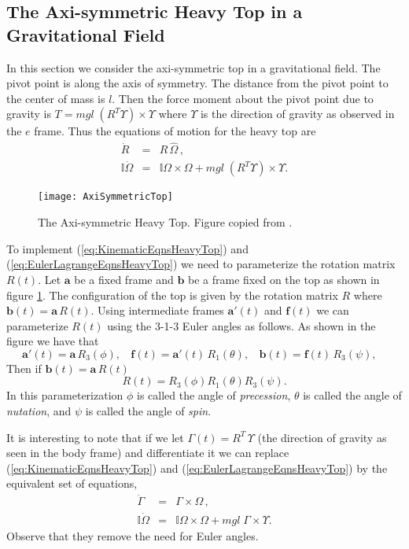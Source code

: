 \documentclass[graybox,envcountchap,sectrefs]{svmonoMuga}
\begin{document}
\subsection{The Axi-symmetric Heavy Top in a Gravitational Field}
In this section we consider the axi-symmetric top in a gravitational field. The pivot point is along the axis of symmetry. The distance from the pivot point to the center of mass is $l$. 
Then the force moment about the pivot point due to gravity is $T= mgl\;(R^T \Upsilon)\times \Upsilon$ where $\Upsilon$ is the direction of gravity as observed in the $e$ frame. Thus the equations of 
motion for the heavy top are
\begin{eqnarray}
\dot{R} &=& R \, \widehat{\Omega}\,, \label{eq:KinematicEqnsHeavyTop} \\
\mathbb{I}\dot{\Omega} &=&  \mathbb{I}\Omega \times \Omega + mgl\;(R^T \Upsilon)\times \Upsilon.
\label{eq:EulerLagrangeEqnsHeavyTop}
\end{eqnarray}
\begin{figure}[ht]
\begin{center}
\texttt{[image: AxiSymmetricTop]}
\renewcommand{\baselinestretch}{1}\selectfont
\caption{The Axi-symmetric Heavy Top. Figure copied from \cite{Greenwood}.}
\label{Fig:HeavyTop}
\renewcommand{\baselinestretch}{1.5}\selectfont
\end{center}
\end{figure}
To implement (\ref{eq:KinematicEqnsHeavyTop}) and (\ref{eq:EulerLagrangeEqnsHeavyTop})
we need to parameterize the rotation matrix $R(t)$.
Let $\mathbf{a}$ be a fixed frame and $\mathbf{b}$ be a frame fixed on the top as shown in figure \ref{Fig:HeavyTop}. The configuration of the top is given by the rotation matrix $R$ where $\mathbf{b}(t)=\mathbf{a}\,R(t)
$. Using intermediate frames $\mathbf{a}'(t)$ and $\mathbf{f}(t)$ we can parameterize $R(t)$ using the 3-1-3 Euler angles as follows. As shown in the figure we have that
\[
\mathbf{a}'(t)=\mathbf{a}\,R_3(\phi),\:\:\:\:\mathbf{f}(t)=\mathbf{a}'(t)\,R_1(\theta),\:\:\:\:\mathbf{b}(t)=\mathbf{f}(t)\,R_3(\psi),\:\:\:\:
\]
Then if $\mathbf{b}(t)=\mathbf{a}\,R(t)$
\[
R(t)=R_3(\phi)R_1(\theta)R_3(\psi).
\]
In this parameterization $\phi$ is called the angle of \textit{precession}, $\theta$ is called the angle of \textit{nutation}, and $\psi$ is called the angle of \textit{spin}.

It is interesting to note that if we let $\Gamma(t)=R^T\,\Upsilon$ (the direction of gravity as seen in the body frame) and differentiate it we can replace 
(\ref{eq:KinematicEqnsHeavyTop}) and (\ref{eq:EulerLagrangeEqnsHeavyTop}) by the equivalent set of equations,
\begin{eqnarray}
\dot{\Gamma} &=& \Gamma \times {\Omega}\,, \label{eq:KinematicEqnsHeavyTop} \\
\mathbb{I}\dot{\Omega} &=&  \mathbb{I}\Omega \times \Omega + mgl\;\Gamma \times \Upsilon.
\label{eq:EulerLagrangeEqnsHeavyTop}
\end{eqnarray}
Observe that they remove the need for Euler angles.
\end{document}

